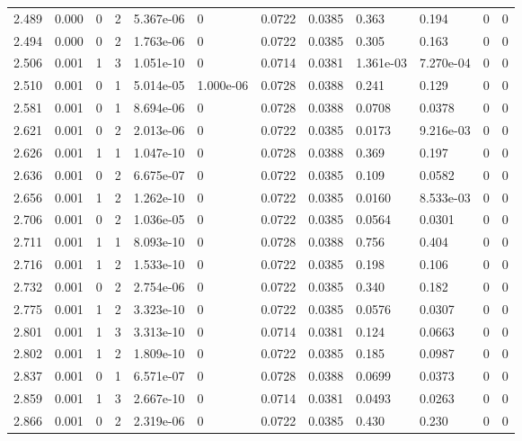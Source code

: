 \documentclass[preview]{standalone}
\begin{document}
{{{{\begin{tabular}{L{1.2cm}C{1.2cm} C{0.3cm}C{0.5cm} C{1.4cm}C{1.4cm} C{1.4cm}C{1.4cm} C{1.6cm}C{1.6cm} C{1.6cm}C{1.6cm}}
  2.489  &  0.000  & 0     &  2 &  5.367e-06  & 0  &  0.0722&   0.0385& 0.363 & 0.194   &  0 & 0  \\ 
  2.494  &  0.000  & 0     &  2 &  1.763e-06  & 0  &  0.0722&   0.0385& 0.305 & 0.163   &  0 & 0  \\ 
  2.506  &  0.001  & 1     &  3 &  1.051e-10  & 0  &  0.0714&   0.0381& 1.361e-03 & 7.270e-04   &  0 & 0  \\ 
  2.510  &  0.001  & 0     &  1 &  5.014e-05  & 1.000e-06  &  0.0728&   0.0388& 0.241 & 0.129   &  0 & 0  \\ 
  2.581  &  0.001  & 0     &  1 &  8.694e-06  & 0  &  0.0728&   0.0388& 0.0708 & 0.0378   &  0 & 0  \\ 
  2.621  &  0.001  & 0     &  2 &  2.013e-06  & 0  &  0.0722&   0.0385& 0.0173 & 9.216e-03   &  0 & 0  \\ 
  2.626  &  0.001  & 1     &  1 &  1.047e-10  & 0  &  0.0728&   0.0388& 0.369 & 0.197   &  0 & 0  \\ 
  2.636  &  0.001  & 0     &  2 &  6.675e-07  & 0  &  0.0722&   0.0385& 0.109 & 0.0582   &  0 & 0  \\ 
  2.656  &  0.001  & 1     &  2 &  1.262e-10  & 0  &  0.0722&   0.0385& 0.0160 & 8.533e-03   &  0 & 0  \\ 
  2.706  &  0.001  & 0     &  2 &  1.036e-05  & 0  &  0.0722&   0.0385& 0.0564 & 0.0301   &  0 & 0  \\ 
  2.711  &  0.001  & 1     &  1 &  8.093e-10  & 0  &  0.0728&   0.0388& 0.756 & 0.404   &  0 & 0  \\ 
  2.716  &  0.001  & 1     &  2 &  1.533e-10  & 0  &  0.0722&   0.0385& 0.198 & 0.106   &  0 & 0  \\ 
  2.732  &  0.001  & 0     &  2 &  2.754e-06  & 0  &  0.0722&   0.0385& 0.340 & 0.182   &  0 & 0  \\ 
  2.775  &  0.001  & 1     &  2 &  3.323e-10  & 0  &  0.0722&   0.0385& 0.0576 & 0.0307   &  0 & 0  \\ 
  2.801  &  0.001  & 1     &  3 &  3.313e-10  & 0  &  0.0714&   0.0381& 0.124 & 0.0663   &  0 & 0  \\ 
  2.802  &  0.001  & 1     &  2 &  1.809e-10  & 0  &  0.0722&   0.0385& 0.185 & 0.0987   &  0 & 0  \\ 
  2.837  &  0.001  & 0     &  1 &  6.571e-07  & 0  &  0.0728&   0.0388& 0.0699 & 0.0373   &  0 & 0  \\ 
  2.859  &  0.001  & 1     &  3 &  2.667e-10  & 0  &  0.0714&   0.0381& 0.0493 & 0.0263   &  0 & 0  \\ 
  2.866  &  0.001  & 0     &  2 &  2.319e-06  & 0  &  0.0722&   0.0385& 0.430 & 0.230   &  0 & 0  \\ 

\end{tabular}}}}}
\end{document}
